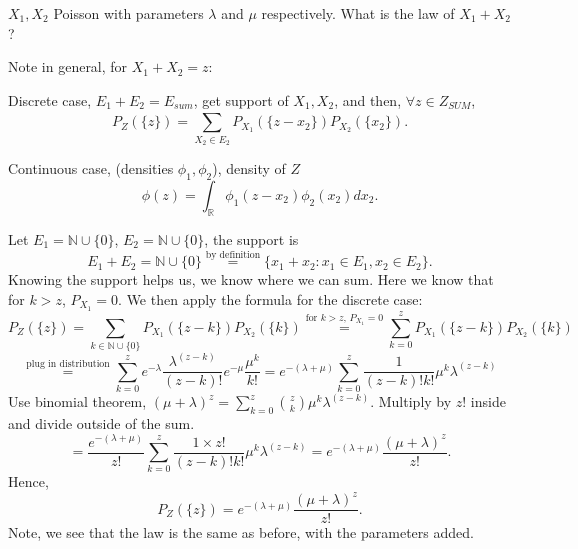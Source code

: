 \begin{exercise}[]
    \label{ex:11.8}
    $X_1, X_2$ Poisson with parameters $\lambda$ and $\mu$ respectively.
    What is the law of $X_1 + X_2$?

    Note in general, for $X_1 + X_2 = z$:

    Discrete case, $E_1 + E_2 = E_{sum}$, get support of $X_1, X_2$, and then,
    $\forall z \in Z_{SUM}$, 
    \[
    P_Z(\{z\} ) = \sum_{X_2 \in E_2}^{ } P_{X_1}(\{z-x_2\} )P_{X_2}(\{x_2\} )
    .\] 

    Continuous case, (densities $\phi_1, \phi_2$), density of $Z$ 
    \[
    \phi(z) = \int_{\mathbb{R}} \phi_1(z-x_2)\phi_2(x_2)dx_2
    .\] 

    Let $E_1 = \mathbb{N} \cup \{0\} $, $ E_2 = \mathbb{N} \cup \{0\} $, the support is
    \[
    E_1 + E_2 = \mathbb{N} \cup  \{0\} \stackrel{\text{by definition}}{=}
    \{x_1 + x_2: x_1 \in  E_1, x_2 \in E_2\} 
    .\] 
    Knowing the support helps us,
    we know where we can sum. Here we know that for $k>z$, $P_{X_1} = 0$.
    We then apply the formula for the discrete case:
    \[
    P_Z(\{z\} ) = \sum_{k \in \mathbb{N} \cup \{0\} }^{ } P_{X_1}(\{z-k\} )P_{X_2}(\{k\} ) 
    \stackrel{\text{for $k>z$, $P_{X_1} = 0$}}{=} \sum_{k=0}^{z} P_{X_1}(\{z-k\} )P_{X_2}(\{k\} )
    \] 
    \[
    \stackrel{\text{plug in distribution}}{=} \sum_{k=0}^{z} e^{-\lambda} \frac{\lambda^{(z-k)}}{(z-k)!} e^{-\mu} \frac{\mu^{k}}{k!}
    = e^{-(\lambda + \mu)} \sum_{k=0}^{z} \frac{1}{(z-k)!k!}\mu^{k}\lambda^{(z-k)} 
    \] 
    Use binomial theorem, $(\mu + \lambda)^{z} = \sum_{k=0}^{z} \binom{z}{k} \mu^{k} \lambda^{(z-k)}$. Multiply by
    $z!$ inside and divide outside of the sum.
    \[
    = \frac{e^{-(\lambda + \mu)}}{z!} \sum_{k=0}^{z} \frac{1\times z!}{(z-k)!k!}\mu^{k}\lambda^{(z-k)} 
    = e^{-(\lambda+\mu)} \frac{(\mu+\lambda)^{z}}{z!}
    .\] 
    Hence, 
    \[
    P_Z(\{z\} ) 
    = e^{-(\lambda+\mu)} \frac{(\mu+\lambda)^{z}}{z!}
    .\] 
    Note, we see that the law is the same as before, with the parameters added.

\end{exercise}

